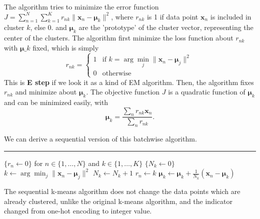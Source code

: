 \documentclass{article}
\begin{document}
        The algorithm tries to minimize the error function $\displaystyle{J=\sum_{n=1}^{N}\sum_{k=1}^{K}r_{nk}\|\textbf{x}_n-\bm\mu_k\|^2}$,
        where $r_{nk}$ is 1 if data point $\textbf{x}_n$ is included in cluster $k$, else 0.
        and $\bm\mu_k$ are the 'prototype' of the cluster vector, representing the center of the clusters. The algorithm first minimize the loss function
        about $r_{nk}$ with $\bm\mu\_k$ fixed, which is simply
        \[r_{nk}=
        \begin{cases}
            1 & \text{if }k=\arg\min_j \|\textbf{x}_n-\bm\mu_j\|^2 \\
            0 & \text{otherwise}
        \end{cases}\]
        This is \textbf{E step} if we look it as a kind of EM algorithm. Then, the algorithm fixes $r_{nk}$ and minimize about
        $\bm\mu_k$. The objective function $J$ is a quadratic function of $\bm\mu_k$ and can be minimized easily, with
        \[
        \bm\mu_k = \frac{\sum_n r_{nk}\textbf{x}_n}{\sum_n r_{nk}}.
        \]

        We can derive a sequential version of this batchwise algorithm.
        
        \begin{algorithm}
            \DontPrintSemicolon
            
            \caption{Sequential K-means clustring algorithm}


            \BlankLine
            \hrule
            $\{r_{n} \leftarrow 0\}$ for $n \in \{1,\dots,N\}$ and $k \in \{1,\dots,K\}$\;
            $\{N_k \leftarrow 0\}$\;
                {
                    $k \leftarrow \arg\min_j\|\textbf{x}_n - \bm\mu_j\|^2$\;
                    $N_k \leftarrow N_k + 1$\;
                    $r_n \leftarrow k$\;
                    $\bm\mu_k \leftarrow \bm\mu_k + \frac{1}{N_k}(\textbf{x}_n-\bm\mu_k)$\;
                }

        \end{algorithm}
        The sequential k-means algorithm does not change the data points which are already clustered,
        unlike the original k-means algorithm, and the indicator changed from one-hot encoding to integer value.
\end{document}
